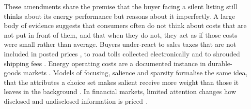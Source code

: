These amendments share the premise that the buyer facing a silent listing still thinks about its energy performance but reasons about it imperfectly. A large body of evidence suggests that consumers often do not think about costs that are not put in front of them, and that when they do not, they act as if those costs were small rather than average. Buyers under-react to sales taxes that are not included in posted prices \citep{chetty_salience_2009}, to road tolls collected electronically \citep{finkelstein_eztax_2009} and to shrouded shipping fees \citep{brown_shrouded_2010}. Energy operating costs are a documented instance in durable-goods markets \citep[e.g.,][]{allcott_consumers_2011, sallee_rational_2014, allcott_evaluating_2015}. Models of focusing, salience and sparsity formalise the same idea, that the attributes a choice set makes salient receive more weight than those it leaves in the background \citep[e.g.,][]{koszegi_model_2013, bordalo_salience_2013, gabaix_sparsity_2014}. In financial markets, limited attention changes how disclosed and undisclosed information is priced \citep[e.g.,][]{hirshleifer_limited_2003, dellavigna_investor_2009}.
